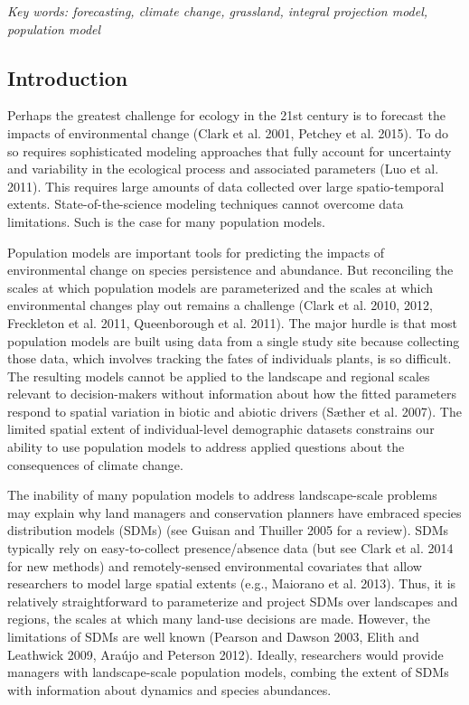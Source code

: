 \documentclass[12pt,]{article}
\begin{document}
\emph{Key words: forecasting, climate change, grassland, integral
projection model, population model}

\subsection{Introduction}\label{introduction}

Perhaps the greatest challenge for ecology in the 21st century is to
forecast the impacts of environmental change (Clark et al. 2001, Petchey
et al. 2015). To do so requires sophisticated modeling approaches that
fully account for uncertainty and variability in the ecological process
and associated parameters (Luo et al. 2011). This requires large amounts
of data collected over large spatio-temporal extents.
State-of-the-science modeling techniques cannot overcome data
limitations. Such is the case for many population models.

Population models are important tools for predicting the impacts of
environmental change on species persistence and abundance. But
reconciling the scales at which population models are parameterized and
the scales at which environmental changes play out remains a challenge
(Clark et al. 2010, 2012, Freckleton et al. 2011, Queenborough et al.
2011). The major hurdle is that most population models are built using
data from a single study site because collecting those data, which
involves tracking the fates of individuals plants, is so difficult. The
resulting models cannot be applied to the landscape and regional scales
relevant to decision-makers without information about how the fitted
parameters respond to spatial variation in biotic and abiotic drivers
(Sæther et al. 2007). The limited spatial extent of individual-level
demographic datasets constrains our ability to use population models to
address applied questions about the consequences of climate change.

The inability of many population models to address landscape-scale
problems may explain why land managers and conservation planners have
embraced species distribution models (SDMs) (see Guisan and Thuiller
2005 for a review). SDMs typically rely on easy-to-collect
presence/absence data (but see Clark et al. 2014 for new methods) and
remotely-sensed environmental covariates that allow researchers to model
large spatial extents (e.g., Maiorano et al. 2013). Thus, it is
relatively straightforward to parameterize and project SDMs over
landscapes and regions, the scales at which many land-use decisions are
made. However, the limitations of SDMs are well known (Pearson and
Dawson 2003, Elith and Leathwick 2009, Araújo and Peterson 2012).
Ideally, researchers would provide managers with landscape-scale
population models, combing the extent of SDMs with information about
dynamics and species abundances.
\end{document}
